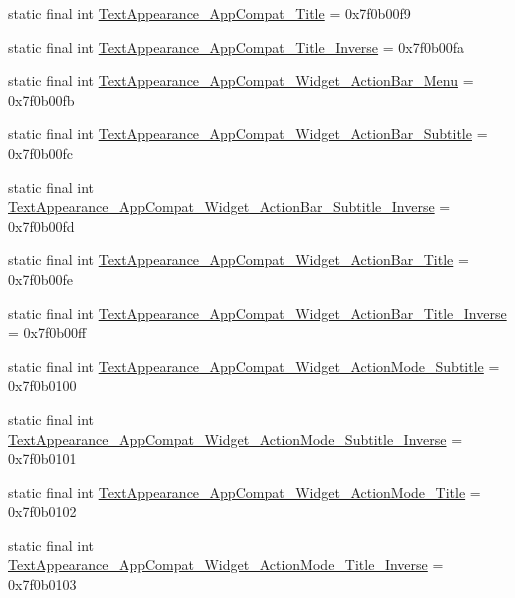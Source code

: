 \begin{CompactItemize}
\item 
static final int \hyperlink{classandroid_1_1support_1_1v7_1_1appcompat_1_1_r_1_1style_78eb731633fb0a785b7b8d98f23bc54e}{TextAppearance\_\-AppCompat\_\-Title} = 0x7f0b00f9
\item 
static final int \hyperlink{classandroid_1_1support_1_1v7_1_1appcompat_1_1_r_1_1style_93a5624275a72498df4229d118c538a5}{TextAppearance\_\-AppCompat\_\-Title\_\-Inverse} = 0x7f0b00fa
\item 
static final int \hyperlink{classandroid_1_1support_1_1v7_1_1appcompat_1_1_r_1_1style_985896064a0be99404bcb6976c3e5565}{TextAppearance\_\-AppCompat\_\-Widget\_\-ActionBar\_\-Menu} = 0x7f0b00fb
\item 
static final int \hyperlink{classandroid_1_1support_1_1v7_1_1appcompat_1_1_r_1_1style_4015a872fe7aae9fcdf2b4913d142c1a}{TextAppearance\_\-AppCompat\_\-Widget\_\-ActionBar\_\-Subtitle} = 0x7f0b00fc
\item 
static final int \hyperlink{classandroid_1_1support_1_1v7_1_1appcompat_1_1_r_1_1style_5484e344160905bffa859efb66434e46}{TextAppearance\_\-AppCompat\_\-Widget\_\-ActionBar\_\-Subtitle\_\-Inverse} = 0x7f0b00fd
\item 
static final int \hyperlink{classandroid_1_1support_1_1v7_1_1appcompat_1_1_r_1_1style_43dd8d3557830372e5778aa150d804ae}{TextAppearance\_\-AppCompat\_\-Widget\_\-ActionBar\_\-Title} = 0x7f0b00fe
\item 
static final int \hyperlink{classandroid_1_1support_1_1v7_1_1appcompat_1_1_r_1_1style_fe96b81ac5e860ee2c1ee60186a76524}{TextAppearance\_\-AppCompat\_\-Widget\_\-ActionBar\_\-Title\_\-Inverse} = 0x7f0b00ff
\item 
static final int \hyperlink{classandroid_1_1support_1_1v7_1_1appcompat_1_1_r_1_1style_a9bf70c60c3e40340de0fa78efe17a85}{TextAppearance\_\-AppCompat\_\-Widget\_\-ActionMode\_\-Subtitle} = 0x7f0b0100
\item 
static final int \hyperlink{classandroid_1_1support_1_1v7_1_1appcompat_1_1_r_1_1style_ccc7b8128f3fccaf8fd1e715e817ba8c}{TextAppearance\_\-AppCompat\_\-Widget\_\-ActionMode\_\-Subtitle\_\-Inverse} = 0x7f0b0101
\item 
static final int \hyperlink{classandroid_1_1support_1_1v7_1_1appcompat_1_1_r_1_1style_46f90bed3365bfe323b4a240b15475bf}{TextAppearance\_\-AppCompat\_\-Widget\_\-ActionMode\_\-Title} = 0x7f0b0102
\item 
static final int \hyperlink{classandroid_1_1support_1_1v7_1_1appcompat_1_1_r_1_1style_26b4f3708d08b4d5528c6a456bffa57e}{TextAppearance\_\-AppCompat\_\-Widget\_\-ActionMode\_\-Title\_\-Inverse} = 0x7f0b0103

\end{CompactItemize}
